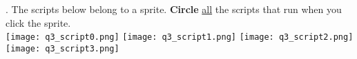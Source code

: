 . The scripts below belong to a sprite. \textbf{Circle} \underline{all} the scripts that run when you click the sprite. \\

\texttt{[image: q3\_script0.png]} \hspace{1cm}
\texttt{[image: q3\_script1.png]} \hspace{1cm}
\texttt{[image: q3\_script2.png]} \hspace{1cm}
\texttt{[image: q3\_script3.png]} \hspace{1cm}